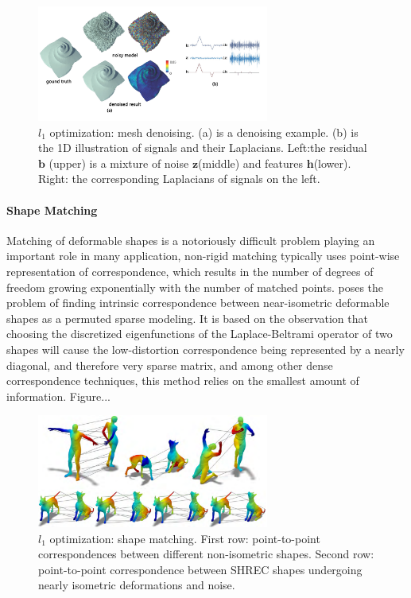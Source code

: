\begin{figure}[ht]
  \centering
  \includegraphics[width=3in]{images/denoise_L1}
  \caption{$l_1$ optimization: mesh denoising\cite{wang2014decoupling}. (a) is a denoising example. (b) is the 1D illustration of signals and their Laplacians. Left:the residual $\mathbf{b}$ (upper) is a mixture of noise $\mathbf{z}$(middle) and features $\mathbf{h}$(lower). Right: the corresponding Laplacians of signals on the left.}
\end{figure}

\paragraph{Shape Matching} Matching of deformable shapes is a notoriously difficult problem playing an important role in many application, non-rigid matching typically uses point-wise representation of correspondence, which results in the number of degrees of freedom growing exponentially with the number of matched points. \cite{pokrass2013sparse} poses the problem of finding intrinsic correspondence between near-isometric deformable shapes as a permuted sparse modeling. It is based on the observation that choosing the discretized eigenfunctions of the Laplace-Beltrami operator of two shapes will cause the low-distortion correspondence being represented by a nearly diagonal, and therefore very sparse matrix, and among other dense correspondence techniques, this method relies on the smallest amount of information. Figure...

\begin{figure}[ht]
  \centering
  \includegraphics[width=3in]{images/matching_L1}
  \caption{$l_1$ optimization: shape matching\cite{wang2014decoupling}. First row: point-to-point correspondences between different non-isometric shapes. Second row: point-to-point correspondence between SHREC shapes undergoing nearly isometric deformations and noise.}
\end{figure}

